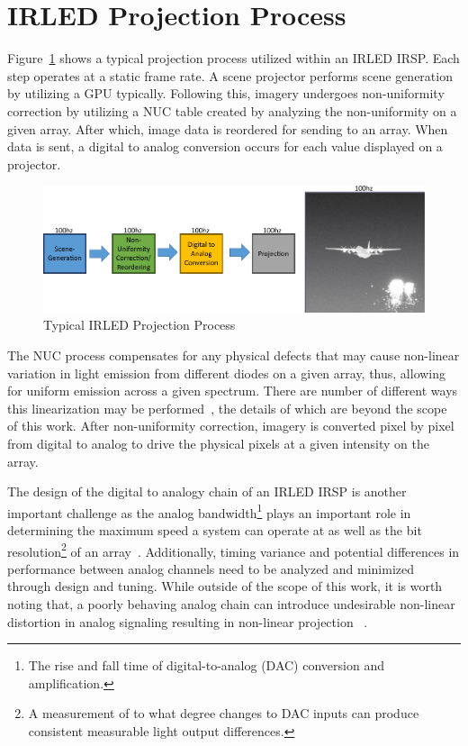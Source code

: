 \section{IRLED Projection Process}
    Figure~\ref{fig:typical_projection} shows a typical projection process utilized within an IRLED IRSP. Each step operates at a static frame rate. A scene projector performs scene generation by utilizing a GPU typically. Following this, imagery undergoes non-uniformity correction by utilizing a NUC table created by analyzing the non-uniformity on a given array. After which, image data is reordered for sending to an array. When data is sent, a digital to analog conversion occurs for each value displayed on a projector.

    \begin{figure}
        \centering
        \includegraphics[width=1.0\textwidth]{fig/typical_projection_system.pdf}
        \caption{Typical IRLED Projection Process}
        \label{fig:typical_projection}
    \end{figure}

    The NUC process compensates for any physical defects that may cause non-linear variation in light emission from different diodes on a given array, thus, allowing for uniform emission across a given spectrum. There are number of different ways this linearization may be performed~\cite{BrowningEtAl2016, LandwehrEtAl2017, BarakhshanEtAl2018_2, BarakhshanEtAl2019, BarakhshanEtAl2019_2}, the details of which are beyond the scope of this work. After non-uniformity correction, imagery is converted pixel by pixel from digital to analog to drive the physical pixels at a given intensity on the array.

    The design of the digital to analogy chain of an IRLED IRSP is another important challenge as the analog bandwidth\footnote{The rise and fall time of digital-to-analog (DAC) conversion and amplification.} plays an important role in determining the maximum speed a system can operate at as well as the bit resolution\footnote{A measurement of to what degree changes to DAC inputs can produce consistent measurable light output differences.} of an array~\cite{EjzakEtAl2019}. Additionally, timing variance and potential differences in performance between analog channels need to be analyzed and minimized through design and tuning. While outside of the scope of this work, it is worth noting that, a poorly behaving analog chain can introduce undesirable non-linear distortion in analog signaling resulting in non-linear projection ~\cite{Freeman1977, Gordon1978, ChanEtAl2008}.

